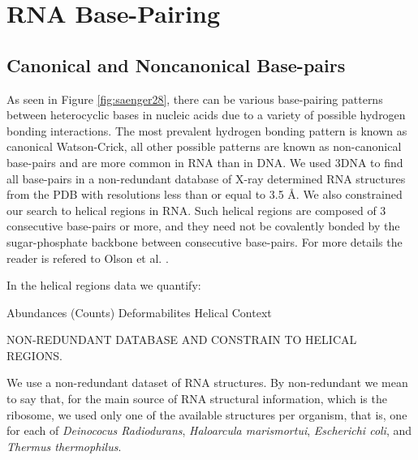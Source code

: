 \chapter{RNA Base-Pairing}
\label{basepairs} 

\section{Canonical and Noncanonical Base-pairs}
As  seen   in  Figure   \ref{fig:saenger28},  there  can   be  various
base-pairing patterns between heterocyclic  bases in nucleic acids due
to  a variety  of possible  hydrogen bonding  interactions.   The most
prevalent   hydrogen   bonding   pattern   is   known   as   canonical
Watson-Crick, all  other possible patterns are  known as non-canonical
base-pairs and  are more common in RNA  than in DNA.  We  used 3DNA to
find all  base-pairs in a  non-redundant database of  X-ray determined
RNA structures from the PDB with resolutions less than or equal to 3.5
\AA.  We also  constrained our search to helical  regions in RNA. Such
helical regions are composed of  3 consecutive base-pairs or more, and
they  need not be  covalently bonded  by the  sugar-phosphate backbone
between  consecutive  base-pairs.   For  more details  the  reader  is
refered to Olson et al. \cite{olson2009}.



In the helical regions data we quantify:

Abundances (Counts)
Deformabilites
Helical Context



NON-REDUNDANT DATABASE AND CONSTRAIN TO HELICAL REGIONS.

We use a non-redundant dataset of RNA structures.  By non-redundant we
mean to say  that, for the main source  of RNA structural information,
which is  the ribosome, we used  only one of  the available structures
per   organism,  that   is,   one  for   each  of   \textit{Deinococus
  Radiodurans},  \textit{Haloarcula  marismortui},  \textit{Escherichi
  coli},  and  \textit{Thermus thermophilus}.

